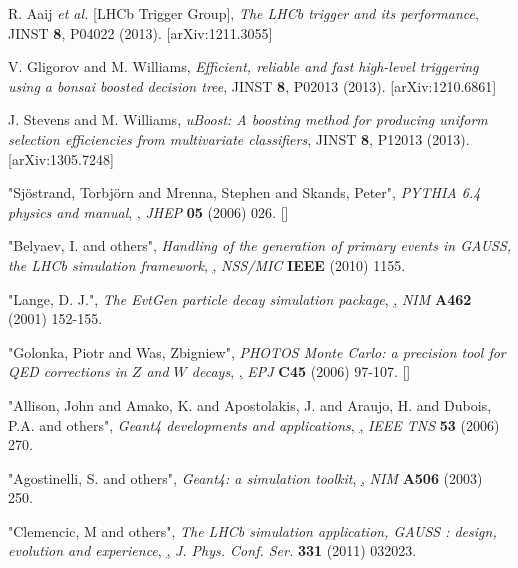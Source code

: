 \documentclass{JINST}
\theoremstyle{definition}
\theoremstyle{remark}
\begin{document}
\begin{thebibliography}{9}

R. Aaij {\em et al.} [LHCb Trigger Group], 
{\em The LHCb trigger and its performance}, 
JINST {\bf 8}, P04022 (2013). 
[arXiv:1211.3055]

V. Gligorov and M. Williams, 
{\em Efficient, reliable and fast high-level triggering using a bonsai boosted decision tree}, 
JINST {\bf 8}, P02013 (2013). 
[arXiv:1210.6861]

J. Stevens and M. Williams,
{\em uBoost: A boosting method for producing uniform selection efficiencies from multivariate classifiers}, 
JINST {\bf 8}, P12013 (2013). 
[arXiv:1305.7248]

{"Sj\"{o}strand, Torbj\"{o}rn and Mrenna, Stephen and Skands, Peter"},
\emph{PYTHIA 6.4 physics and manual},
\href{http://dx.doi.org/10.1088/1126-6708/2006/05/026},
{\emph{JHEP} {\bf 05} (2006) 026}.
[]

{"Belyaev, I. and others"},
\emph{Handling of the generation of primary events in GAUSS, the LHCb simulation framework},
\href{http://dx.doi.org/10.1109/NSSMIC.2010.5873949},
{\emph{NSS/MIC} {\bf IEEE} (2010) 1155}.

{"Lange, D. J."},
\emph{The EvtGen particle decay simulation package},
\href{http://dx.doi.org/10.1016/S0168-9002(01)00089-4},
{\emph{NIM} {\bf A462} (2001) 152-155}.

{"Golonka, Piotr and Was, Zbigniew"},
\emph{PHOTOS Monte Carlo: a precision tool for QED corrections in $Z$ and $W$ decays},
\href{http://dx.doi.org/10.1140/epjc/s2005-02396-4},
{\emph{EPJ} {\bf C45} (2006) 97-107}.
[]

{"Allison, John and Amako, K. and Apostolakis, J. and Araujo, H. and Dubois, P.A. and others"},
\emph{Geant4 developments and applications},
\href{http://dx.doi.org/10.1109/TNS.2006.869826},
{\emph{IEEE TNS} {\bf 53} (2006) 270}.

{"Agostinelli, S. and others"},
\emph{Geant4: a simulation toolkit},
\href{http://dx.doi.org/10.1016/S0168-9002(03)01368-8},
{\emph{NIM} {\bf A506} (2003) 250}.

{"Clemencic, M and others"},
\emph{The LHCb simulation application, GAUSS : design, evolution and experience},
\href{http://dx.doi.org/10.1088/1742-6596/331/3/032023},
{\emph{J. Phys. Conf. Ser.} {\bf 331} (2011) 032023}.


\end{thebibliography}
\end{document}
